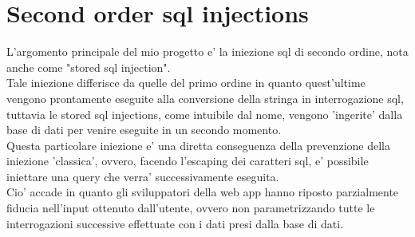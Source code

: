 \documentclass{book}
\begin{document}
\chapter{Second order sql injections}
L'argomento principale del mio progetto e' la iniezione sql di secondo ordine, nota anche come "stored sql injection".
\\
Tale iniezione differisce da quelle del primo ordine in quanto quest'ultime vengono prontamente eseguite alla conversione
della stringa in interrogazione sql, tuttavia le stored sql injections, come intuibile dal nome, vengono 'ingerite' dalla base di dati
per venire eseguite in un secondo momento.
\\
Questa particolare iniezione e' una diretta conseguenza della prevenzione della iniezione 'classica', ovvero,
facendo l'escaping dei caratteri sql, e' possibile iniettare una query che verra' successivamente eseguita.
\\
Cio' accade in quanto gli sviluppatori della web app hanno riposto parzialmente fiducia nell'input ottenuto
dall'utente, ovvero non parametrizzando tutte le interrogazioni successive effettuate con i dati presi dalla base di dati. 
\\
\\
\end{document}
